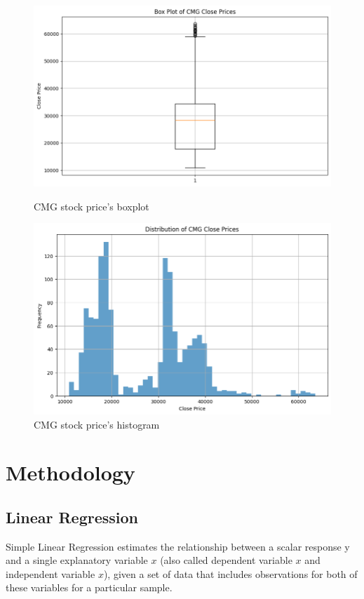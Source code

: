 \documentclass{ieeeojies}
\begin{document}
\begin{figure}[H]
    \centering
    \begin{minipage}{0.23\textwidth}
        \centering
        \includegraphics[width=1\textwidth]{bibliography/Figure/CMG_Boxplot.png}
        \caption{CMG stock price's boxplot}
        \label{fig:1}
    \end{minipage}
    \hfill
    \begin{minipage}{0.23\textwidth}
        \centering
        \includegraphics[width=1\textwidth]{bibliography/Figure/CMG_histogram.png}
        \caption{CMG stock price's histogram}
        \label{fig:2}
    \end{minipage}
\end{figure}
\section{Methodology}
\subsection{Linear Regression}
Simple Linear Regression estimates the relationship between a scalar response y and a single explanatory variable $x$ (also called dependent variable $x$ and independent variable $x$), given a set of data that includes observations for both of these variables for a particular sample. \cite{b5}
\end{document}
